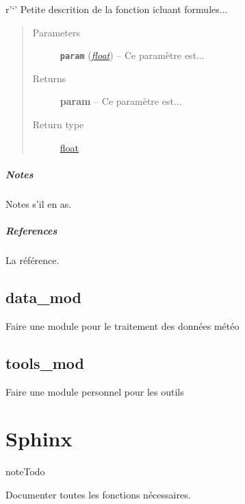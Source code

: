 \documentclass[letterpaper,10pt,english]{sphinxmanual}
\begin{document}
\begin{fulllineitems}
\label{python:solar_mod.cherche_index}
r'`' Petite descrition de la fonction icluant formules...
\begin{quote}\begin{description}
\item[{Parameters}] \leavevmode
\textbf{\texttt{param}} (\href{https://docs.python.org/library/functions.html\#float}{\emph{float}}) -- Ce paramètre est...

\item[{Returns}] \leavevmode
\textbf{param} -- Ce paramètre est...

\item[{Return type}] \leavevmode
\href{https://docs.python.org/library/functions.html\#float}{float}

\end{description}\end{quote}
\paragraph{Notes}

Notes s'il en as.
\paragraph{References}

La référence.

\end{fulllineitems}



\section{data\_mod}
\label{python:data-mod}
Faire une module pour le traitement des données météo


\section{tools\_mod}
\label{python:tools-mod}
Faire une module personnel pour les outils


\chapter{Sphinx}
\label{sphinx::doc}\label{sphinx:sphinx}
\begin{notice}{note}{Todo}

Documenter toutes les fonctions nécessaires.
\end{notice}
\end{document}
